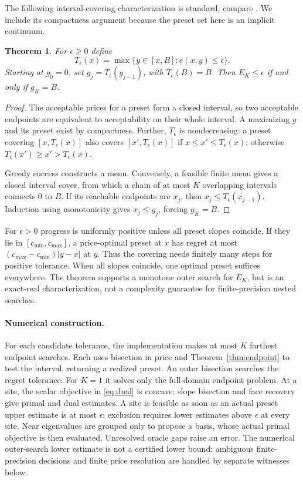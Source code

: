 \documentclass[11pt]{article}
\newtheorem{theorem}{Theorem}
\begin{document}
The following interval-covering characterization is standard; compare
\cite[Section~4.2]{cardinal2025}. We include its compactness argument
because the preset set here is an implicit continuum.

\begin{theorem}\label{thm:greedy}
For $\epsilon\ge0$ define
\begin{equation}
 T_\epsilon(x)=\max\{y\in[x,B]:e(x,y)\le\epsilon\}.
\end{equation}
Starting at $g_0=0$, set $g_j=T_\epsilon(g_{j-1})$, with
$T_\epsilon(B)=B$. Then $E_K\le\epsilon$ if and only if $g_K=B$.
\end{theorem}
\begin{proof}
The acceptable prices for a preset form a closed interval, so two acceptable
endpoints are equivalent to acceptability on their whole interval. A
maximizing $y$ and its preset exist by compactness. Further, $T_\epsilon$
is nondecreasing: a preset covering $[x,T_\epsilon(x)]$ also covers
$[x',T_\epsilon(x)]$ if $x\le x'\le T_\epsilon(x)$; otherwise
$T_\epsilon(x')\ge x'>T_\epsilon(x)$.

Greedy success constructs a menu. Conversely, a feasible finite menu gives
a closed interval cover, from which a chain of at most $K$ overlapping
intervals connects $0$ to $B$. If its reachable endpoints are $x_j$,
then $x_j\le T_\epsilon(x_{j-1})$. Induction using monotonicity gives
$x_j\le g_j$, forcing $g_K=B$.
\end{proof}

For $\epsilon>0$ progress is uniformly positive unless all preset slopes
coincide. If they lie in $[c_{\min},c_{\max}]$, a price-optimal preset
at $x$ has regret at most $(c_{\max}-c_{\min})|y-x|$ at $y$.
Thus the covering needs finitely many steps for positive tolerance. When
all slopes coincide, one optimal preset suffices everywhere.
The theorem supports a monotone outer search for $E_K$, but is an exact-real
characterization, not a complexity guarantee for finite-precision nested searches.

\paragraph{Numerical construction.}
For each candidate tolerance, the implementation makes at most $K$ farthest
endpoint searches. Each uses bisection in price and Theorem~\ref{thm:endpoint}
to test the interval, returning a realized preset. An outer bisection searches
the regret tolerance. For $K=1$ it solves only the full-domain endpoint problem.
At a site, the scalar objective in \eqref{eq:dual} is concave; slope bisection
and face recovery give primal and dual estimates. A site is feasible as soon
as an actual preset upper estimate is at most $\epsilon$; exclusion requires
lower estimates above $\epsilon$ at every site. Near eigenvalues are grouped
only to propose a basis, whose actual primal objective is then evaluated.
Unresolved oracle gaps raise an error. The numerical outer-search lower
estimate is not a certified lower bound: ambiguous finite-precision decisions
and finite price resolution are handled by separate witnesses below.
\end{document}
